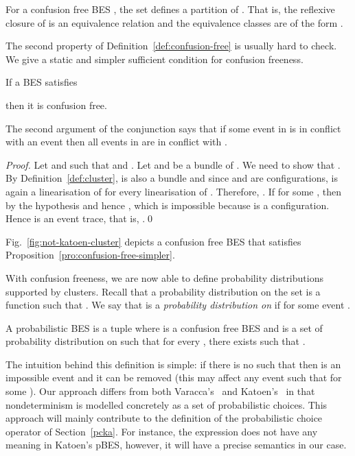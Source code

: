 \documentclass{llncs}
\newcommand{\<}{\langle}
\renewcommand{\>}{\rangle}
\begin{document}
\begin{proposition}\label{pro:confusion-free-theorem}
For a confusion free BES , the set  defines a partition of . That is, the reflexive closure of  is an equivalence relation and the equivalence classes are of the form .
\end{proposition}

The second property of Definition~\ref{def:confusion-free} is usually hard to check. We give a static and simpler sufficient condition for confusion freeness.
\begin{proposition}\label{pro:confusion-free-simpler}
If a BES  satisfies 

then it is confusion free.
\end{proposition}

The second argument of the conjunction says that if some event in  is in conflict with an event  then all events in  are in conflict with .

\begin{proof}
Let  and  such that  and . Let  and  be a bundle of . We need to show that . By Definition~\ref{def:cluster},  is also a bundle and since  and  are configurations,  is again a linearisation of  for every linearisation   of . Therefore, . If  for some , then  by the hypothesis and hence , which is impossible because  is a configuration. Hence  is an event trace, that is, .\qed
\end{proof}

\begin{example}
Fig.~\ref{fig:not-katoen-cluster} depicts a confusion free BES that satisfies Proposition~\ref{pro:confusion-free-simpler}.
\end{example}

With confusion freeness, we are now able to define probability distributions supported by clusters. Recall that a probability distribution on the set  is a function  such that . We say that  is a \textit{probability distribution on } if  for some event .

\begin{definition}
A probabilistic BES is a tuple  where  is a confusion free BES and  is a set of probability distribution on  such that for every , there exists  such that .
\end{definition}

The intuition behind this definition is simple: if there is no  such that  then  is an impossible event and  it can be removed (this may affect any event  such that  for some ). Our approach differs from both Varacca's~\cite{Var03} and Katoen's~\cite{Kat96} in that nondeterminism is modelled concretely as a set of probabilistic choices. This approach will mainly contribute to the definition of the probabilistic choice operator  of Section~\ref{pcka}. For instance, the expression  does not have any meaning in Katoen's pBES, however, it will have a precise semantics in our case.
\end{document}
